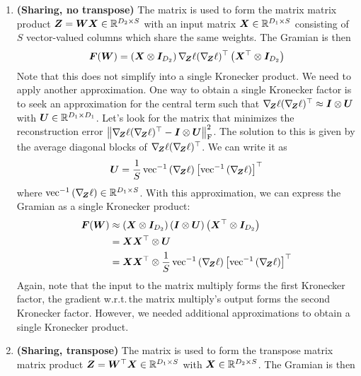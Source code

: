 \documentclass{article}
\begin{document}
\begin{enumerate}
\item \textbf{(Sharing, no transpose)} The matrix is used to form the matrix matrix product ${\bm{Z}} = {\bm{W}} {\bm{X}} \in {\mathbb{R}}^{D_2 \times S}$ with an input matrix ${\bm{X}} \in {\mathbb{R}}^{D_1 \times S}$ consisting of $S$ vector-valued columns which share the same weights.
  The Gramian is then
  \begin{align*}
    {\bm{F}}({\bm{W}}) =
    \left(
    {\bm{X}}
    \otimes
    {\bm{I}}_{D_2}
    \right)
    \nabla_{\!{{\bm{Z}}}}\ell (\nabla_{\!{{\bm{Z}}}}\ell)^{\top}
    \left(
    {\bm{X}}^{\top}
    \otimes
    {\bm{I}}_{D_2}
    \right)
  \end{align*}
  Note that this does not simplify into a single Kronecker product.
  We need to apply another approximation.
  One way to obtain a single Kronecker factor is to seek an approximation for the central term such that $\nabla_{\!{{\bm{Z}}}}\ell (\nabla_{\!{{\bm{Z}}}}\ell)^{\top} \approx {\bm{I}} \otimes {\bm{U}}$ with ${\bm{U}} \in {\mathbb{R}}^{D_1 \times D_1}$.
  Let's look for the matrix that minimizes the reconstruction error
  $\left\lVert \nabla_{\!{{\bm{Z}}}}\ell (\nabla_{\!{{\bm{Z}}}}\ell)^{\top} - {\bm{I}} \otimes {\bm{U}}
  \right\rVert_{\text{F}}^2$. The solution to this is given by the average
  diagonal blocks of $\nabla_{\!{{\bm{Z}}}}\ell (\nabla_{\!{{\bm{Z}}}}\ell)^{\top}$. We can write it
  as
  \begin{align}
    {\bm{U}}
    =
    \frac{1}{S}
    \operatorname{vec}^{-1}
    \left(
    \nabla_{\!{{\bm{Z}}}}\ell
    \right)
    \left[
    \operatorname{vec}^{-1}
    \left(
    \nabla_{\!{{\bm{Z}}}}\ell
    \right)
    \right]^{\top}
  \end{align}
  where $\operatorname{vec}^{-1} \left(\nabla_{\!{{\bm{Z}}}}\ell \right) \in {\mathbb{R}}^{D_1 \times S}$.
  With this approximation, we can express the Gramian as a single Kronecker product:
  \begin{align*}
    \begin{split}
      {\bm{F}}({\bm{W}})
      &\approx
      \left(
      {\bm{X}}
      \otimes
      {\bm{I}}_{D_2}
      \right)
      \left(
      {\bm{I}}
      \otimes
      {\bm{U}}
      \right)
      \left(
      {\bm{X}}^{\top}
      \otimes
      {\bm{I}}_{D_2}
      \right)
      \\
      &=
        {\bm{X}} {\bm{X}}^{\top}
        \otimes
        {\bm{U}}
      \\
      &=
        {\bm{X}} {\bm{X}}^{\top}
        \otimes
        \frac{1}{S}
        \operatorname{vec}^{-1}
        \left(
        \nabla_{\!{{\bm{Z}}}}\ell
        \right)
        \left[
        \operatorname{vec}^{-1}
        \left(
        \nabla_{\!{{\bm{Z}}}}\ell
        \right)
        \right]^{\top}
    \end{split}
  \end{align*}
  Again, note that the input to the matrix multiply forms the first Kronecker factor, the gradient w.r.t.\,the matrix multiply's output forms the second Kronecker factor.
  However, we needed additional approximations to obtain a single Kronecker product.

\item \textbf{(Sharing, transpose)} The matrix is used to form the transpose matrix matrix product ${\bm{Z}} = {\bm{W}}^{\top} {\bm{X}} \in {\mathbb{R}}^{D_1 \times S}$ with ${\bm{X}} \in {\mathbb{R}}^{D_2 \times S}$.
  The Gramian is then
\end{enumerate}
\end{document}
